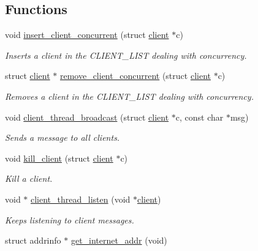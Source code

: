 \subsection*{Functions}
\begin{DoxyCompactItemize}
\item 
void \hyperlink{zip-zop-server_8c_a84f39912128d6dc7a66bbdd88fad00b5}{insert\+\_\+client\+\_\+concurrent} (struct \hyperlink{structclient}{client} $\ast$c)
\begin{DoxyCompactList}\small\item\em Inserts a client in the {\ttfamily C\+L\+I\+E\+N\+T\+\_\+\+L\+I\+ST} dealing with concurrency. \end{DoxyCompactList}\item 
struct \hyperlink{structclient}{client} $\ast$ \hyperlink{zip-zop-server_8c_a37f14ecc30cc2b45249b544fe70f2b6d}{remove\+\_\+client\+\_\+concurrent} (struct \hyperlink{structclient}{client} $\ast$c)
\begin{DoxyCompactList}\small\item\em Removes a client in the {\ttfamily C\+L\+I\+E\+N\+T\+\_\+\+L\+I\+ST} dealing with concurrency. \end{DoxyCompactList}\item 
void \hyperlink{zip-zop-server_8c_a3608e5c14908c59afe16bf1fc85895c9}{client\+\_\+thread\+\_\+broadcast} (struct \hyperlink{structclient}{client} $\ast$c, const char $\ast$msg)
\begin{DoxyCompactList}\small\item\em Sends a message to all clients. \end{DoxyCompactList}\item 
void \hyperlink{zip-zop-server_8c_ae5845d7e65c1c7407d1df63105450b5e}{kill\+\_\+client} (struct \hyperlink{structclient}{client} $\ast$c)
\begin{DoxyCompactList}\small\item\em Kill a client. \end{DoxyCompactList}\item 
void $\ast$ \hyperlink{zip-zop-server_8c_a9076f5ad072ef4654917b662bfdd94ce}{client\+\_\+thread\+\_\+listen} (void $\ast$\hyperlink{structclient}{client})
\begin{DoxyCompactList}\small\item\em Keeps listening to client messages. \end{DoxyCompactList}\item 
struct addrinfo $\ast$ \hyperlink{zip-zop-server_8c_a2d9748875d07382b9dbecb97c6cd9b62}{get\+\_\+internet\+\_\+addr} (void)

\end{DoxyCompactItemize}
